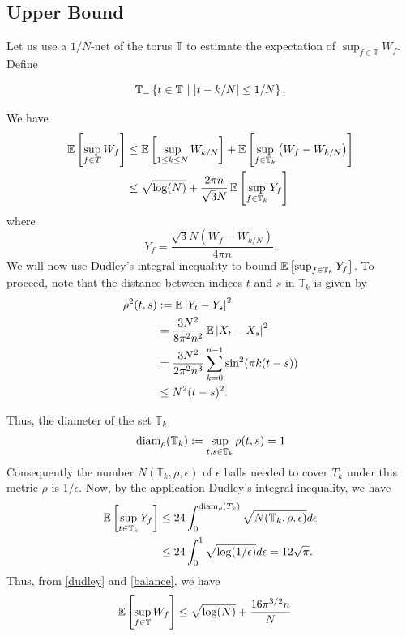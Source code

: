 \subsection{Upper Bound}

Let us use a $1/N$-net of the torus $\mathbb{T}$ to estimate the expectation of
$\sup_{f \in \mathbb{T}} {W_f}$. Define

\begin{equation*}
\mathbb{T}_ = \left\{t \in \mathbb{T} ~ \middle| ~ \left|t-k/N\right| \leq 1/N \right\}.
\end{equation*}

We have
\begin{align}
\nonumber\operatorname{\mathbb{E}}\left[\sup_{f \in T} W_f \right] & \leq \operatorname{\mathbb{E}}\left[\sup_{1 \leq k \leq N} W_{k/N} \right] + \operatorname{\mathbb{E}}\left[\sup_{f \in \mathbb{T}_k} \left(W_{f} - W_{k/N}\right) \right]\\
& \leq \sqrt{\log(N)} + \frac{2 \pi n}{\sqrt{3}N} \operatorname{\mathbb{E}}\left[\sup_{f \in \mathbb{T}_k} Y_f \right]\label{balance}
\end{align}
where 
\begin{equation}
Y_f = \frac{\sqrt{3} N  \left(W_f - W_{k/N}\right)}{4 \pi n}.
\end{equation}
We will now use Dudley's integral inequality to bound $\operatorname{\mathbb{E}}\left[\sup_{f \in \mathbb{T}_k} Y_f \right]$. To proceed, note that the distance between indices $t$ and $s$ in $\mathbb{T}_k$ is given by
\begin{align*}
\rho^2(t,s) & := \operatorname{\mathbb{E}} \left|Y_t - Y_s\right|^2\\
& = \frac{3 N^2}{8 \pi^2 n^2} \operatorname{\mathbb{E}} \left|X_t - X_s\right|^2\\
& = \frac{3 N^2}{2 \pi^2 n^3} \sum_{k=0}^{n-1}{\sin^2(\pi k (t - s))}\\
& \leq N^2 (t-s)^2.
\end{align*}

Thus, the diameter of the set $\mathbb{T}_k$
\begin{align*}
\operatorname{diam}_\rho(\mathbb{T}_k) &:= \sup_{t,s  \in \mathbb{T}_k}\rho(t,s) = 1\\
\end{align*}
Consequently the number $N(\mathbb{T}_k, \rho, \epsilon)$ of $\epsilon$ balls needed to cover $T_k$ under this metric $\rho$ is $1/\epsilon$. Now, by the application Dudley's integral inequality, we have
\begin{align}
\operatorname{\mathbb{E}}\left[\sup_{t \in \mathbb{T}_k} Y_f \right] & \leq 24 \int_0^{\operatorname{diam}_\rho(T_k)} \sqrt{N(\mathbb{T}_k, \rho, \epsilon)} d\epsilon\\
 & \leq 24 \int_0^1 \sqrt{\log(1/\epsilon)} d\epsilon = 12 \sqrt{\pi}. \label{dudley}
\end{align}
Thus, from \eqref{dudley} and \eqref{balance}, we have
\begin{align*}
\operatorname{\mathbb{E}}\left[\sup_{f \in \mathbb{T}} W_f \right] & \leq  \sqrt{\log(N)} +  \frac{ 16 \pi^{3/2} n} { N}
\end{align*}


